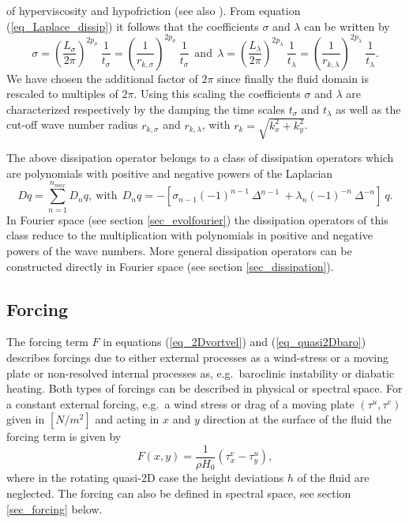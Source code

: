 of hyperviscosity and hypofriction (see also \cite{danilovandgurarie2001}).
From equation (\ref{eq_Laplace_dissip}) it follows that the coefficients
$\sigma$ and $\lambda$ can be written by
\begin{equation} \label{eq_siglam}
  \sigma  = \left(\frac{L_{\sigma}}{2 \pi} \right)^{2 p_{\sigma}}
            \ \frac{1}{t_{\sigma}} 
          = \left(\frac{1}{r_{k,\sigma}}\right)^{2 p_{\sigma}}
            \ \frac{1}{t_{\sigma}} 
  \ \ \mbox{and} \ \
  \lambda = \left(\frac{L_{\lambda}}{2 \pi} \right)^{2 p_{\lambda}}
            \ \frac{1}{t_{\lambda}}
          = \left(\frac{1}{r_{k,\lambda}} \right)^{2 p_{\lambda}}
            \ \frac{1}{t_{\lambda}}.
\end{equation}
We have chosen the additional factor of $2 \pi$ since finally the
fluid domain is rescaled to multiples of $2 \pi$. Using this scaling
the coefficients $\sigma$ and $\lambda$ are characterized respectively 
by the damping the time scales $t_{\sigma}$ and $t_{\lambda}$ as well
as the cut-off wave number radius $r_{k,\sigma}$ and $r_{k,\lambda}$,
with $r_{k} = \sqrt{k^{2}_{x} + k^{2}_{y}}$.

The above dissipation operator belongs to a class of dissipation operators 
which are polynomials with positive and negative powers of the Laplacian
\begin{equation} \label{eq_Laplace_dissip_poly}
  D q = \sum_{n = 1}^{n_{max}} D_{n} q,
  \ \mbox{with} \ \
  D_{n} q 
   = 
 -\left[
   \sigma_{n-1} \left(-1 \right)^{n-1} \ \Delta^{n-1}
   \ +
   \lambda_{n} \left(-1 \right)^{-n} \ \Delta^{-n}
  \right] \ q.
\end{equation}
In Fourier space (see section \ref{sec_evolfourier}) the dissipation 
operators of this class reduce to the multiplication with polynomials 
in positive and negative powers of the wave numbers. More general 
dissipation operators can be constructed directly in Fourier space 
(see section \ref{sec_dissipation}).

\subsection{Forcing}
The forcing term $F$ in equations (\ref{eq_2Dvortvel}) and 
(\ref{eq_quasi2Dbaro}) describes forcings due to either 
external processes as a wind-stress or a moving plate or
non-resolved internal processes as, e.g.\ baroclinic instability 
or diabatic heating. Both types of forcings can be described 
in physical or spectral space. For a constant external forcing, 
e.g.\ a wind stress or drag of a moving plate $(\tau^{u},\tau^{v})$ 
given in $[N/m^{2}]$ and acting in $x$ and $y$ direction at the surface 
of the fluid the forcing term is given by 
\begin{equation} \label{eq_Fstressdrag}
 F(x,y) = \frac{1}{\rho H_{0}} \left( \tau_{x}^{v} - \tau_{y}^{u} \right),
\end{equation}
where in the rotating quasi-2D case the height deviations $h$ of the
fluid are neglected. The forcing can also be defined in spectral
space, see section \ref{sec_forcing} below.
